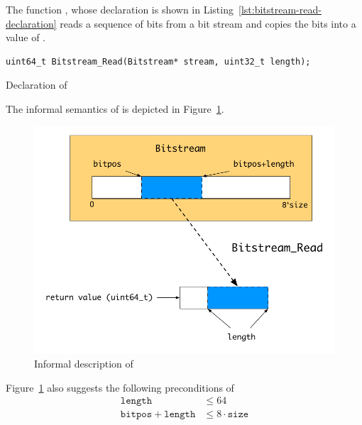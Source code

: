 The function \bitstreamread, whose declaration is shown in Listing~\ref{lst:bitstream-read-declaration}
reads a sequence of bits from a bit stream and copies the bits into a value of .


\begin{listing}[hbt]
\begin{lstlisting}[style=acsl-block]
    uint64_t Bitstream_Read(Bitstream* stream, uint32_t length);
\end{lstlisting}
\caption{\label{lst:bitstream-read-declaration} Declaration of \bitstreamread}
\end{listing}

\FloatBarrier

The informal semantics of \bitstreamread is depicted in Figure~\ref{fig:bit-stream-read}.

\begin{figure}[hbt]
\begin{center}
\includegraphics[scale=0.85]{Figures/bit-stream-read.pdf}
\caption{Informal description of \bitstreamread}
\label{fig:bit-stream-read}
\end{center}
\end{figure}

Figure~\ref{fig:bit-stream-read} also suggests the following preconditions of \bitstreamread
\begin{subequations}
\label{eq:bit-stream-read-pre}
\begin{align}
   \mathtt{length} &\leq 64 \\
   \mathtt{bitpos} + \mathtt{length} &\leq 8 \cdot \mathtt{size}
\end{align}
\end{subequations}

